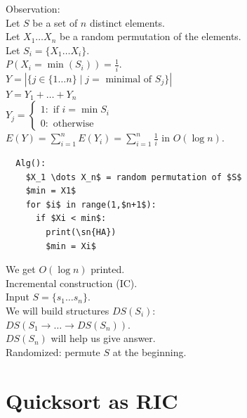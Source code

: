 \documentclass[a4paper, 12pt]{book}
\theoremstyle{definition}
\theoremstyle{remark}
\begin{document}
Observation: \\
Let $S$ be a set of $n$ distinct elements. \\
Let $X_1 \dots X_n$ be a random permutation of the elements. \\
Let $S_i = \{X_1 \dots X_i\}$. \\
$P(X_i = \min (S_i)) = \frac{1}{i}$. \\
$Y = \left| \{j \in \{1 \dots n\} \mid j = \text{ minimal of } S_j\} \right|$ \\
$Y = Y_1 + \dots + Y_n$ \\
$Y_j = \begin{cases}
  1: \text{ if } i = \min S_i \\
  0: \text{ otherwise}
\end{cases}$ \\
$E(Y) = \sum_{i=1}^{n} E(Y_i) = \sum_{i=1}^{n} \frac{1}{i}$ in $O(\log n)$.
\begin{lstlisting}
  Alg():
    $X_1 \dots X_n$ = random permutation of $S$
    $min = X1$
    for $i$ in range(1,$n+1$):
      if $Xi < min$:
        print(\sn{HA})
        $min = Xi$
\end{lstlisting}
We get $O(\log n)$  printed. \\
Incremental construction (IC). \\
Input $S = \{s_1 \dots s_n\}$. \\
We will build structures $DS(S_i)$: \\
$DS(S_1 \to \dots \to DS(S_n))$. \\
$DS(S_n)$ will help us give answer. \\
Randomized: permute $S$ at the beginning.


\section{Quicksort as RIC}
\end{document}
